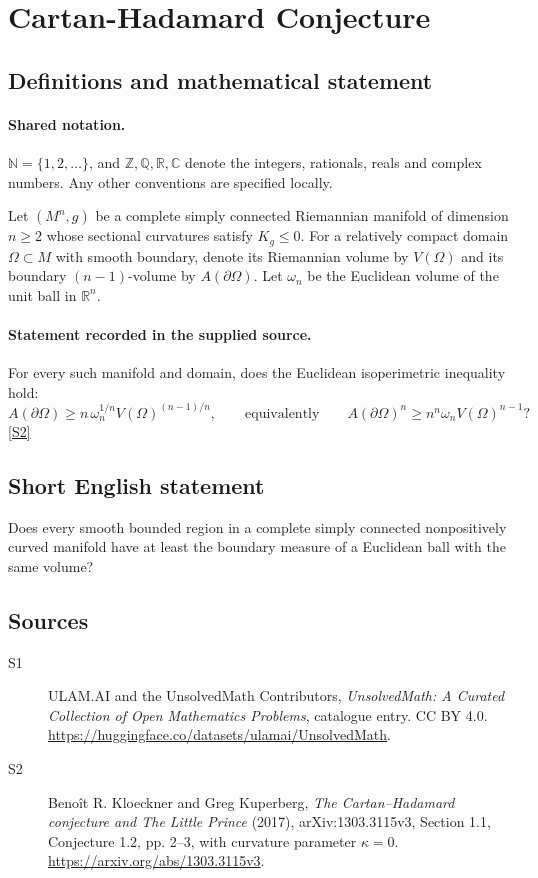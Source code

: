 \documentclass[11pt]{article}
\newcommand{\sref}[2]{\hyperlink{source:#1:#2}{[S#2]}}
\begin{document}
\section{Cartan-Hadamard Conjecture}\label{statement}

\subsection{Definitions and mathematical statement}

\paragraph{Shared notation.}$\mathbb N=\{1,2,\ldots\}$, and $\mathbb Z,\mathbb Q,\mathbb R,\mathbb C$ denote the integers, rationals, reals and complex numbers. Any other conventions are specified locally.


Let $(M^n,g)$ be a complete simply connected Riemannian manifold of dimension $n\ge2$ whose sectional curvatures satisfy $K_g\le0$. For a relatively compact domain $\Omega\subset M$ with smooth boundary, denote its Riemannian volume by $V(\Omega)$ and its boundary $(n-1)$-volume by $A(\partial\Omega)$. Let $\omega_n$ be the Euclidean volume of the unit ball in $\mathbb R^n$.
\paragraph{Statement recorded in the supplied source.}
For every such manifold and domain, does the Euclidean isoperimetric inequality hold:
\[
 A(\partial\Omega)\ge n\,\omega_n^{1/n}V(\Omega)^{(n-1)/n},
 \qquad\text{equivalently}\qquad
 A(\partial\Omega)^n\ge n^n\omega_n V(\Omega)^{n-1}?
\]
\sref{statement}{2}
\subsection{Short English statement}
Does every smooth bounded region in a complete simply connected nonpositively curved manifold have at least the boundary measure of a Euclidean ball with the same volume?
\subsection{Sources}
\begin{description}
\item[\hypertarget{source:statement:1}{S1}] ULAM.AI and the UnsolvedMath Contributors, \emph{UnsolvedMath: A Curated Collection of Open Mathematics Problems}, catalogue entry. CC BY 4.0. \url{https://huggingface.co/datasets/ulamai/UnsolvedMath}.
\item[\hypertarget{source:statement:2}{S2}] Benoît R. Kloeckner and Greg Kuperberg, \emph{The Cartan--Hadamard conjecture and The Little Prince} (2017), arXiv:1303.3115v3, Section 1.1, Conjecture 1.2, pp. 2--3, with curvature parameter $\kappa=0$. \url{https://arxiv.org/abs/1303.3115v3}.
\end{description}
\label{end:statement}
\end{document}
